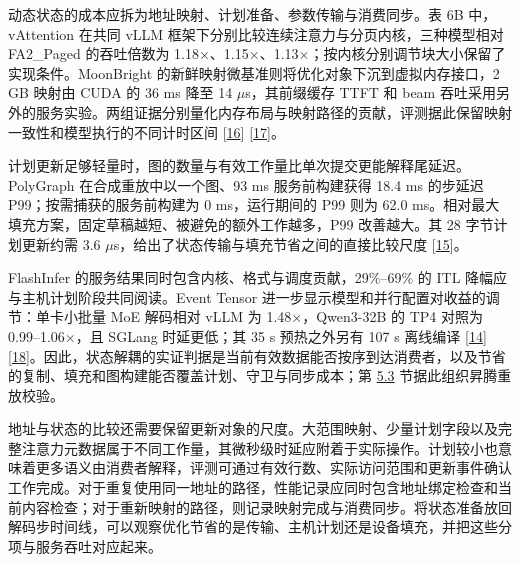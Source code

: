 \documentclass[UTF8,10.5pt,fontset=windows]{ctexart}
\begin{document}
动态状态的成本应拆为地址映射、计划准备、参数传输与消费同步。表 6B
中，vAttention 在共同 vLLM
框架下分别比较连续注意力与分页内核，三种模型相对 FA2\_Paged 的吞吐倍数为
1.18\(\times\)、1.15\(\times\)、1.13\(\times\)；按内核分别调节块大小保留了实现条件。MoonBright
的新鲜映射微基准则将优化对象下沉到虚拟内存接口，2 GB 映射由 CUDA 的 36
ms 降至 14 \(\mu\)s，其前缀缓存 TTFT 和 beam
吞吐采用另外的服务实验。两组证据分别量化内存布局与映射路径的贡献，评测据此保留映射一致性和模型执行的不同计时区间
{[}\protect\hyperlink{ref-prabhu2025vattention}{16}{]}
{[}\protect\hyperlink{ref-zhang2026moonbright}{17}{]}。

计划更新足够轻量时，图的数量与有效工作量比单次提交更能解释尾延迟。PolyGraph
在合成重放中以一个图、93 ms 服务前构建获得 18.4 ms 的步延迟
P99；按需捕获的服务前构建为 0 ms，运行期间的 P99 则为 62.0
ms。相对最大填充方案，固定草稿越短、被避免的额外工作越多，P99
改善越大。其 28 字节计划更新约需 3.6
\(\mu\)s，给出了状态传输与填充节省之间的直接比较尺度
{[}\protect\hyperlink{ref-yang2026polygraph}{15}{]}。

FlashInfer 的服务结果同时包含内核、格式与调度贡献，29\%--69\% 的 ITL
降幅应与主机计划阶段共同阅读。Event Tensor
进一步显示模型和并行配置对收益的调节：单卡小批量 MoE 解码相对 vLLM 为
1.48\(\times\)，Qwen3-32B 的 TP4 对照为 0.99--1.06\(\times\)，且 SGLang 时延更低；其 35 s
预热之外另有 107 s 离线编译
{[}\protect\hyperlink{ref-ye2025flashinfer}{14}{]}
{[}\protect\hyperlink{ref-jin2026eventtensor}{18}{]}。因此，状态解耦的实证判据是当前有效数据能否按序到达消费者，以及节省的复制、填充和图构建能否覆盖计划、守卫与同步成本；第
\protect\hyperlink{section-5-3}{5.3} 节据此组织昇腾重放校验。

地址与状态的比较还需要保留更新对象的尺度。大范围映射、少量计划字段以及完整注意力元数据属于不同工作量，其微秒级时延应附着于实际操作。计划较小也意味着更多语义由消费者解释，评测可通过有效行数、实际访问范围和更新事件确认工作完成。对于重复使用同一地址的路径，性能记录应同时包含地址绑定检查和当前内容检查；对于重新映射的路径，则记录映射完成与消费同步。将状态准备放回解码步时间线，可以观察优化节省的是传输、主机计划还是设备填充，并把这些分项与服务吞吐对应起来。
\end{document}
